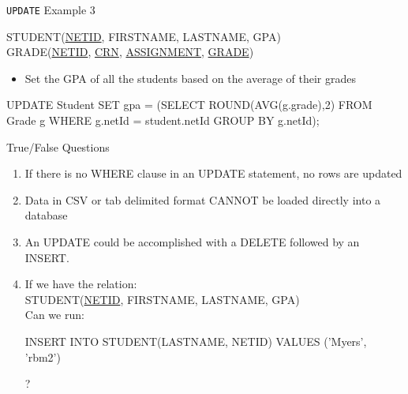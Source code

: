\documentclass[aspectratio=169]{beamer}
\newenvironment{noindentitemize}
{ \begin{itemize}
 \setlength{\itemsep}{1.5ex}
  \setlength{\parsep}{0pt}   
  \setlength{\parskip}{0pt}
 \addtolength{\leftskip}{-2em}
 }
{ \end{itemize} }
\begin{document}
\begin{frame}[fragile]{\texttt{UPDATE} Example 3}

STUDENT(\underline{NETID}, FIRSTNAME, LASTNAME, GPA)\\
GRADE(\underline{NETID}, \underline{CRN}, \underline{ASSIGNMENT}, \underline{GRADE})\\
\vspace{2em}
\begin{noindentitemize}
\item Set the GPA of all the students based on the average of their grades
\end{noindentitemize}

\begin{SQL}
UPDATE Student 
SET gpa = (SELECT ROUND(AVG(g.grade),2)
           FROM Grade g
           WHERE g.netId = student.netId
           GROUP BY g.netId);
\end{SQL}

\end{frame}
	
\begin{frame}[fragile]{True/False Questions}

\begin{enumerate}
\item If there is no WHERE clause in an UPDATE statement, no rows are updated
\item Data in CSV or tab delimited format CANNOT be loaded directly into a database
\item An UPDATE could be accomplished with a DELETE followed by an INSERT.
\item If we have the relation:\\
STUDENT(\underline{NETID}, FIRSTNAME, LASTNAME, GPA)\\
Can we run: \\
\begin{SQL}
INSERT INTO STUDENT(LASTNAME, NETID) VALUES ('Myers', 'rbm2')
\end{SQL}


?

\end{enumerate}
%
\end{frame}
\end{document}
